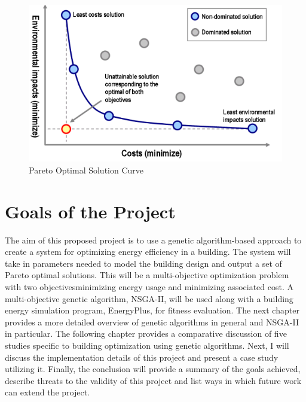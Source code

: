 \begin{figure}[htbp]
\centering
\includegraphics[width = 0.5\linewidth]{images/pareto.png}
\caption{Pareto Optimal Solution Curve \cite{Coley2002}}
\label{fig:pareto}
\end{figure}

\section{Goals of the Project}\label{sec:goals}

The aim of this proposed project is to use a genetic algorithm-based approach to create a system for optimizing energy efficiency in a building. The system will take in parameters needed to model the building design and output a set of Pareto optimal solutions. This will be a multi-objective optimization problem with two objectives\textemdash minimizing energy usage and minimizing associated cost. A multi-objective genetic algorithm, NSGA-II, will be used along with a building energy simulation program, EnergyPlus, for fitness evaluation. The next chapter provides a more detailed overview of genetic algorithms in general and NSGA-II in particular. The following chapter provides a comparative discussion of five studies specific to building optimization using genetic algorithms. Next, I will discuss the implementation details of this project and present a case study utilizing it. Finally, the conclusion will provide a summary of the goals achieved, describe threats to the validity of this project and list ways in which future work can extend the project. 

